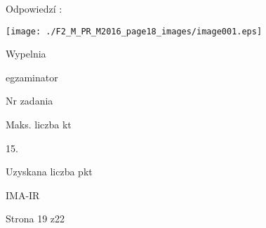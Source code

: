 \documentclass[a4paper,12pt]{article}
\begin{document}
Odpowiedzí :
\begin{center}
\texttt{[image: ./F2\_M\_PR\_M2016\_page18\_images/image001.eps]}
\end{center}
Wypelnia

egzaminator

Nr zadania

Maks. liczba kt

15.

Uzyskana liczba pkt

IMA-IR

Strona 19 z22
\end{document}
